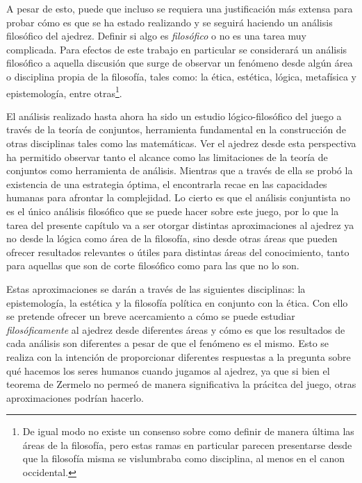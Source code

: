\documentclass[twoside,openright,12pt,a4paper,spanish]{book}
\begin{document}
A pesar de esto, puede que incluso se requiera una justificaci\'on m\'as extensa para probar c\'omo es que se ha estado realizando y se seguir\'a haciendo un an\'alisis filos\'ofico del ajedrez. Definir si algo es \emph{filos\'ofico} o no es una tarea muy complicada. Para efectos de este trabajo en particular se considerar\'a un an\'alisis filos\'ofico a aquella discusi\'on que surge de observar un fenómeno desde alg\'un \'area o disciplina propia de la filosof\'ia, tales como: la \'etica, est\'etica, l\'ogica, metaf\'isica y epistemolog\'ia, entre otras\footnote{De igual modo no existe un consenso sobre como definir de manera \'ultima las \'areas de la filosof\'ia, pero estas ramas en particular parecen presentarse desde que la filosof\'ia misma se vislumbraba como disciplina, al menos en el canon occidental.}.

El an\'alisis realizado hasta ahora ha sido un estudio l\'ogico-filos\'ofico del juego a trav\'es de la teor\'ia de conjuntos, herramienta fundamental en la construcci\'on de otras disciplinas tales como las matem\'aticas. Ver el ajedrez desde esta perspectiva ha permitido observar tanto el alcance como las limitaciones de la teor\'ia de conjuntos como herramienta de an\'alisis. Mientras que a trav\'es de ella se prob\'o la existencia de una estrategia \'optima, el encontrarla recae en las capacidades humanas para afrontar la complejidad. Lo cierto es que el an\'alisis conjuntista no es el \'unico an\'alisis filos\'ofico que se puede hacer sobre este juego, por lo que la tarea del presente cap\'itulo va a ser otorgar distintas aproximaciones al ajedrez ya no desde la l\'ogica como \'area de la filosof\'ia, sino desde otras \'areas que pueden ofrecer resultados relevantes o \'utiles para distintas \'areas del conocimiento, tanto para aquellas que son de corte filos\'ofico como para las que no lo son.

Estas aproximaciones se dar\'an a trav\'es de las siguientes disciplinas: la epistemolog\'ia, la est\'etica  y la filosof\'ia pol\'itica en conjunto con la \'etica. Con ello se pretende ofrecer un breve acercamiento a c\'omo se puede estudiar \emph{filos\'oficamente} al ajedrez desde diferentes \'areas y c\'omo es que los resultados de cada an\'alisis son diferentes a pesar de que el fen\'omeno es el mismo. Esto se realiza con la intenci\'on de proporcionar diferentes respuestas a la pregunta sobre qu\'e hacemos los seres humanos cuando jugamos al ajedrez, ya que si bien el teorema de Zermelo no perme\'o de manera significativa la pr\'acitca del juego, otras aproximaciones podr\'ian hacerlo.
\end{document}
